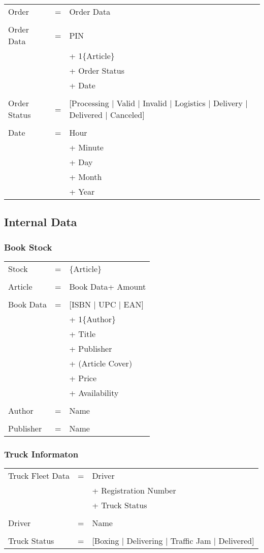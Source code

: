 \documentclass[12pt,a4paper]{article}
\begin{document}
\begin{tabular}{p{3.5cm}p{0.5cm}p{8.5cm}}
\\
Order & = & Order Data\\
\\
Order Data & = & PIN\\
&  & + 1\{Article\}\\
&  & + Order Status\\
&  & + Date \\
\\
Order Status & = & [Processing $|$ Valid $|$ Invalid $|$ Logistics $|$ Delivery $|$ Delivered $|$ Canceled] \\
\\
Date & = & Hour\\
&  & + Minute\\
&  & + Day\\
&  & + Month\\
&  & + Year\\
\end{tabular}

\subsection{Internal Data}

\subsubsection{Book Stock}
\begin{tabular}{p{3.5cm}p{0.5cm}p{8.5cm}}
\\
Stock & = & \{Article\} \\
\\
Article & = & Book Data+ Amount\\
\\
Book Data & = & [ISBN $|$ UPC $|$ EAN]\\
&  & + 1\{Author\}\\
&  & + Title\\
&  & + Publisher\\
&  & + (Article Cover)\\
&  & + Price\\
&  & + Availability\\
\\
Author & = & Name \\
\\
Publisher & = & Name \\
\end{tabular}

\subsubsection{Truck Informaton}

\begin{tabular}{p{3.5cm}p{0.5cm}p{8.5cm}}
\\
Truck Fleet Data & = & Driver\\
&  & + Registration Number\\
&  & + Truck Status \\
\\
Driver & = & Name \\
\\
Truck Status & = & [Boxing $|$ Delivering $|$ Traffic Jam $|$ Delivered] \\
\end{tabular}
\end{document}
